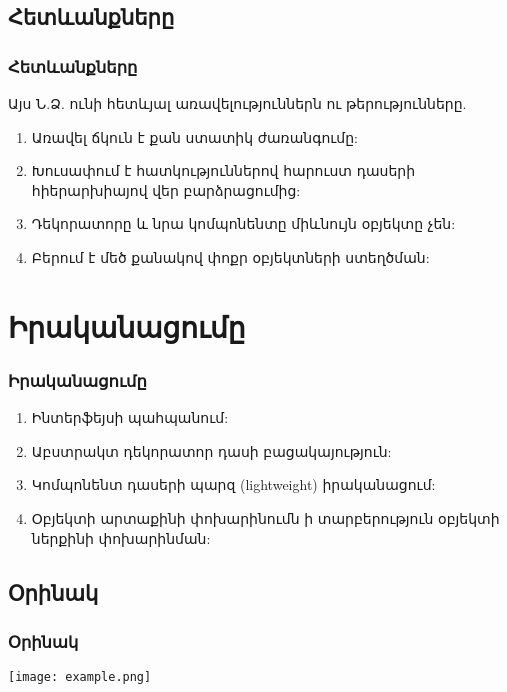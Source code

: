 \documentclass{beamer}
\begin{document}
\subsection{Հետևանքները}
\begin{frame}\frametitle{Հետևանքները}
Այս Ն.Ձ. ունի հետևյալ առավելություններն ու թերությունները.
\vfill
\begin{enumerate}
    \item Առավել ճկուն է քան ստատիկ ժառանգումը: \pause \vfill
    \item Խուսափում է հատկություններով հարուստ դասերի հիերարխիայով
    վեր բարձրացումից: \pause \vfill
    \item Դեկորատորը և նրա կոմպոնենտը միևնույն օբյեկտը չեն: \pause \vfill
    \item Բերում է մեծ քանակով փոքր օբյեկտների ստեղծման:
\end{enumerate}
\end{frame}

\section{Իրականացումը}
\begin{frame}\frametitle{Իրականացումը}
\begin{enumerate}
    \item Ինտերֆեյսի պահպանում: \vfill
    \item Աբստրակտ դեկորատոր դասի բացակայություն: \vfill
    \item Կոմպոնենտ դասերի պարզ (lightweight) իրականացում: \vfill
    \item Օբյեկտի արտաքինի փոխարինումն ի տարբերություն օբյեկտի ներքինի փոխարինման:
\end{enumerate}
\end{frame}

\subsection{Օրինակ}
\begin{frame}\frametitle{Օրինակ}
\begin{center}
    \texttt{[image: example.png]}
\end{center}
\end{frame}
\end{document}
